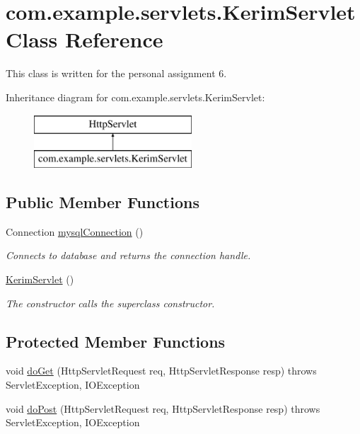 \hypertarget{classcom_1_1example_1_1servlets_1_1_kerim_servlet}{}\section{com.\+example.\+servlets.\+Kerim\+Servlet Class Reference}
\label{classcom_1_1example_1_1servlets_1_1_kerim_servlet}


This class is written for the personal assignment 6.  


Inheritance diagram for com.\+example.\+servlets.\+Kerim\+Servlet\+:\begin{figure}[H]
\begin{center}
\leavevmode
\includegraphics[height=2.000000cm]{classcom_1_1example_1_1servlets_1_1_kerim_servlet}
\end{center}
\end{figure}
\subsection*{Public Member Functions}
\begin{DoxyCompactItemize}
\item 
Connection \hyperlink{classcom_1_1example_1_1servlets_1_1_kerim_servlet_a3668be62679c5fd89eda37828b156fbb}{mysql\+Connection} ()
\begin{DoxyCompactList}\small\item\em Connects to database and returns the connection handle. \end{DoxyCompactList}\item 
\hyperlink{classcom_1_1example_1_1servlets_1_1_kerim_servlet_ab507212f5e073be787370e98807d881a}{Kerim\+Servlet} ()
\begin{DoxyCompactList}\small\item\em The constructor calls the superclass constructor. \end{DoxyCompactList}\end{DoxyCompactItemize}
\subsection*{Protected Member Functions}
\begin{DoxyCompactItemize}
\item 
void \hyperlink{classcom_1_1example_1_1servlets_1_1_kerim_servlet_add82d54e7368760364154a77773395fb}{do\+Get} (Http\+Servlet\+Request req, Http\+Servlet\+Response resp)  throws Servlet\+Exception, I\+O\+Exception 
\item 
void \hyperlink{classcom_1_1example_1_1servlets_1_1_kerim_servlet_ac8c55b1078359fa7c06e63694eb06377}{do\+Post} (Http\+Servlet\+Request req, Http\+Servlet\+Response resp)  throws Servlet\+Exception, I\+O\+Exception 
\end{DoxyCompactItemize}
